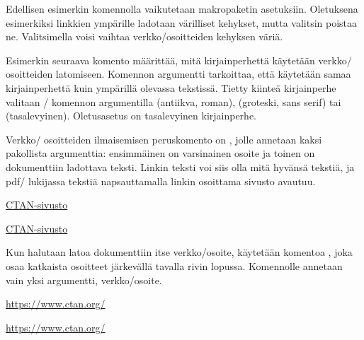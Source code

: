\begin{koodilohkosis}
\usepackage{hyperref}  %
\hypersetup{hidelinks} %
\end{koodilohkosis}

Edellisen esimerkin komennolla  vaikutetaan
makropaketin asetuksiin. Oletuksena esimerkiksi linkkien ympärille
ladotaan värilliset kehykset, mutta valitsin  poistaa
ne. Valitsimella  voisi vaihtaa verkko\-/osoitteiden
kehyksen väriä.

Esimerkin seuraava komento  määrittää, mitä
kirjainperhettä käytetään verkko\-/ osoitteiden latomiseen. Komennon
argumentti  tarkoittaa, että käytetään samaa kirjainperhettä
kuin ympärillä olevassa tekstissä. Tietty kiinteä kirjainperhe valitaan
\-/ komennon argumentilla  (antiikva,
roman),  (groteski, sans serif) tai  (tasalevyinen).
Oletusasetus on tasalevyinen kirjainperhe.

Verkko\-/ osoitteiden ilmaisemisen peruskomento on ,
jolle annetaan kaksi pakollista argumenttia: ensimmäinen on varsinainen
osoite ja toinen on dokumenttiin ladottava teksti. Linkin teksti voi
siis olla mitä hyvänsä tekstiä, ja pdf\-/ lukijassa tekstiä
napsauttamalla linkin osoittama sivusto avautuu.

\begin{koodilohkosis}
\href{https://www.ctan.org/}{CTAN-sivusto}
\end{koodilohkosis}

\begin{tulossis}
  \href{https://www.ctan.org/}{CTAN-sivusto}
\end{tulossis}

Kun halutaan latoa dokumenttiin itse verkko\-/osoite, käytetään komentoa
,  joka osaa katkaista osoitteet
järkevällä tavalla rivin lopussa. Komennolle annetaan vain yksi
argumentti, verkko\-/osoite.

\begin{koodilohkosis}
\url{https://www.ctan.org/}
\end{koodilohkosis}

\begin{tulossis}
  \url{https://www.ctan.org/}
\end{tulossis}

